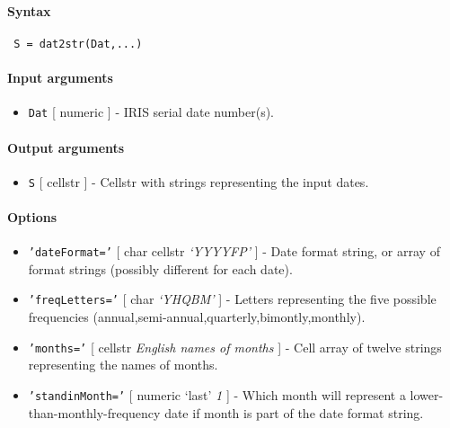 


	\paragraph{Syntax}
 
 \begin{verbatim}
 S = dat2str(Dat,...)
 \end{verbatim}
 
 \paragraph{Input arguments}
 
 \begin{itemize}
 \item
   \texttt{Dat} {[} numeric {]} - IRIS serial date number(s).
 \end{itemize}
 
 \paragraph{Output arguments}
 
 \begin{itemize}
 \item
   \texttt{S} {[} cellstr {]} - Cellstr with strings representing the
   input dates.
 \end{itemize}
 
 \paragraph{Options}
 
 \begin{itemize}
 \item
   \texttt{'dateFormat='} {[} char \textbar{} cellstr \textbar{}
   \emph{`YYYYFP'} {]} - Date format string, or array of format strings
   (possibly different for each date).
 \item
   \texttt{'freqLetters='} {[} char \textbar{} \emph{`YHQBM'} {]} -
   Letters representing the five possible frequencies
   (annual,semi-annual,quarterly,bimontly,monthly).
 \item
   \texttt{'months='} {[} cellstr \textbar{} \emph{English names of
   months} {]} - Cell array of twelve strings representing the names of
   months.
 \item
   \texttt{'standinMonth='} {[} numeric \textbar{} `last' \textbar{}
   \emph{1} {]} - Which month will represent a
   lower-than-monthly-frequency date if month is part of the date format
   string.
 \end{itemize}
 
